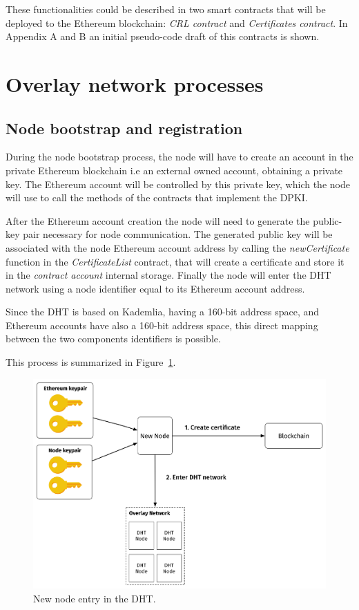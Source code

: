 These functionalities could be described in two smart contracts that will be deployed to the Ethereum blockchain: \textit{CRL contract} and \textit{Certificates contract}.
In Appendix A and B an initial pseudo-code draft of this contracts is shown.

\section{Overlay network processes}

\subsection{Node bootstrap and registration}
During the node bootstrap process, the node will have to create an account in the private Ethereum blockchain i.e an external owned account, obtaining a private key.
The Ethereum account will be controlled by this private key, which the node will use to call the methods of the contracts that implement the DPKI.

After the Ethereum account creation the node will need to generate the public-key pair necessary for node communication.
The generated public key will be associated with the node Ethereum account address by calling the \textit{newCertificate} function in the \textit{CertificateList} contract, that will create a certificate and store it in the \textit{contract account} internal storage.
Finally the node will enter the DHT network using a node identifier equal to its Ethereum account address.

Since the DHT is based on Kademlia, having a 160-bit address space, and Ethereum accounts have also a 160-bit address space, this direct mapping between the two components identifiers is possible.

This process is summarized in Figure~\ref{fig:new-node}.

\begin{figure}
    \includegraphics[width=\linewidth]{Figures/new-node.png}
    \caption{New node entry in the DHT.}
    \label{fig:new-node}
\end{figure}

